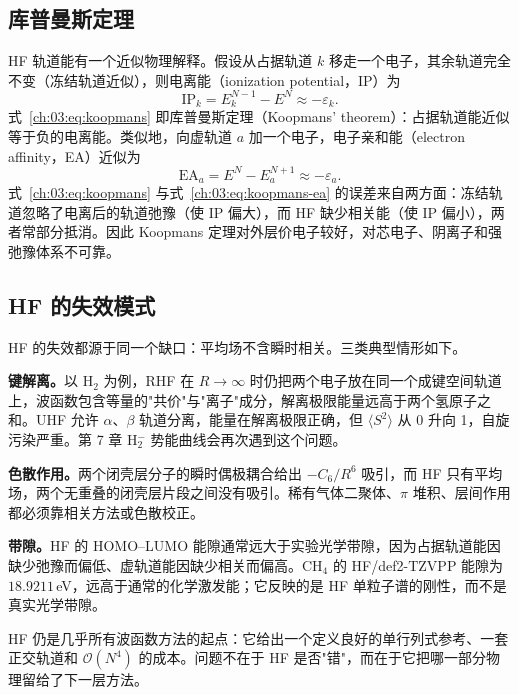 \subsection{库普曼斯定理}
\label{ch:03:sec:koopmans}

HF 轨道能有一个近似物理解释。假设从占据轨道 $k$ 移走一个电子，其余轨道完全不变（冻结轨道近似），则电离能（ionization potential，IP）为
\begin{equation}
\mathrm{IP}_k
= E^{N-1}_k - E^{N}
\approx -\varepsilon_k .
\label{ch:03:eq:koopmans}
\end{equation}
式~\eqref{ch:03:eq:koopmans} 即库普曼斯定理（Koopmans' theorem）\citep{koopmans1934}：占据轨道能近似等于负的电离能。类似地，向虚轨道 $a$ 加一个电子，电子亲和能（electron affinity，EA）近似为
\begin{equation}
\mathrm{EA}_a
= E^{N} - E^{N+1}_a
\approx -\varepsilon_a .
\label{ch:03:eq:koopmans-ea}
\end{equation}
式~\eqref{ch:03:eq:koopmans} 与式~\eqref{ch:03:eq:koopmans-ea} 的误差来自两方面：冻结轨道忽略了电离后的轨道弛豫（使 IP 偏大），而 HF 缺少相关能（使 IP 偏小），两者常部分抵消。因此 Koopmans 定理对外层价电子较好，对芯电子、阴离子和强弛豫体系不可靠。

\subsection{HF 的失效模式}
\label{ch:03:sec:failures}

HF 的失效都源于同一个缺口：平均场不含瞬时相关。三类典型情形如下。

\textbf{键解离。}以 H$_2$ 为例，RHF 在 $R\to\infty$ 时仍把两个电子放在同一个成键空间轨道上，波函数包含等量的"共价"与"离子"成分，解离极限能量远高于两个氢原子之和。UHF 允许 $\alpha$、$\beta$ 轨道分离，能量在解离极限正确，但 $\langle S^2\rangle$ 从 0 升向 1，自旋污染严重。第 7 章 H$_2^-$ 势能曲线会再次遇到这个问题。

\textbf{色散作用。}两个闭壳层分子的瞬时偶极耦合给出 $-C_6/R^6$ 吸引，而 HF 只有平均场，两个无重叠的闭壳层片段之间没有吸引。稀有气体二聚体、$\pi$ 堆积、层间作用都必须靠相关方法或色散校正。

\textbf{带隙。}HF 的 HOMO--LUMO 能隙通常远大于实验光学带隙，因为占据轨道能因缺少弛豫而偏低、虚轨道能因缺少相关而偏高。CH$_4$ 的 HF/def2-TZVPP 能隙为 $18.9211$\,eV，远高于通常的化学激发能；它反映的是 HF 单粒子谱的刚性，而不是真实光学带隙。

HF 仍是几乎所有波函数方法的起点：它给出一个定义良好的单行列式参考、一套正交轨道和 $\mathcal{O}(N^4)$ 的成本。问题不在于 HF 是否"错"，而在于它把哪一部分物理留给了下一层方法。


